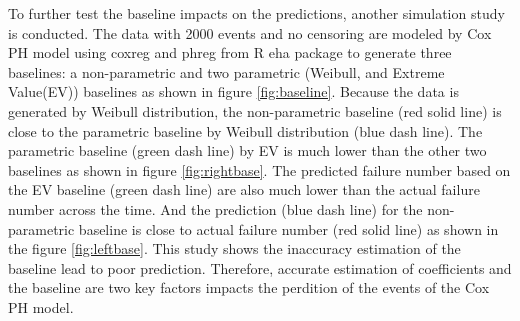 \documentclass[12pt,letterpaper]{article}
\begin{document}
To further test the baseline impacts on the predictions, another simulation study is conducted. The data with 2000 events and no censoring are modeled by Cox PH model using coxreg and phreg from R eha package to generate three baselines: a non-parametric and two parametric (Weibull, and Extreme Value(EV)) baselines as shown in figure \ref{fig:baseline}. Because the data is generated by Weibull distribution, the non-parametric baseline (red solid line) is close to the parametric baseline by Weibull distribution (blue dash line). The parametric baseline (green dash line) by EV is much lower than the other two baselines as shown in figure \ref{fig:rightbase}. The predicted failure number based on the EV baseline (green dash line) are also much lower than the actual failure number across the time. And the prediction (blue dash line) for the non-parametric baseline is close to actual failure number (red solid line) as shown in the figure \ref{fig:leftbase}.
This study shows the inaccuracy estimation of the baseline lead to poor prediction. Therefore, accurate estimation of coefficients and the baseline are two key factors impacts the perdition of the events of the Cox PH model.  
\end{document}
